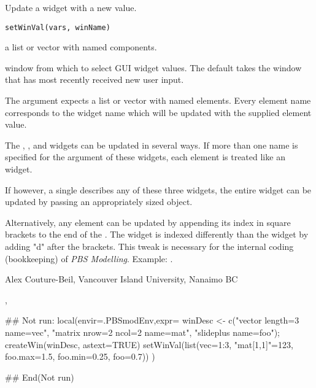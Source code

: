 \documentclass[letterpaper]{book}
\begin{document}
%
\begin{Description}\relax
Update a widget with a new value.
\end{Description}
%
\begin{Usage}
\begin{verbatim}
setWinVal(vars, winName)
\end{verbatim}
\end{Usage}
%
\begin{Arguments}
\begin{ldescription}
\item[\code{vars}] a list or vector with named components.
\item[\code{winName}] window from which to select GUI widget values. The default 
takes the window that has most recently received new user input.
\end{ldescription}
\end{Arguments}
%
\begin{Details}\relax
The  argument expects a list or vector with named elements. 
Every element name corresponds to the widget name which will be updated 
with the supplied element value.

The , , and  widgets can be updated in 
several ways. If more than one name is specified for the  argument 
of these widgets, each element is treated like an  widget. 

If however, a single  describes any of these three widgets, the entire 
widget can be updated by passing an appropriately sized object.

Alternatively, any element can be updated by appending its index in square brackets 
to the end of the . The  widget is indexed differently 
than the  widget by adding "d" after the brackets. This tweak is necessary 
for the internal coding (bookkeeping) of \emph{PBS Modelling}. Example: .
\end{Details}
%
\begin{Author}\relax
Alex Couture-Beil, Vancouver Island University, Nanaimo BC
\end{Author}
%
\begin{SeeAlso}\relax
{}, 
\end{SeeAlso}
%
\begin{Examples}
\begin{ExampleCode}
## Not run: 
local(envir=.PBSmodEnv,expr={
  winDesc <- c("vector length=3 name=vec",
    "matrix nrow=2 ncol=2 name=mat", "slideplus name=foo");
  createWin(winDesc, astext=TRUE)
  setWinVal(list(vec=1:3, "mat[1,1]"=123, foo.max=1.5, foo.min=0.25, foo=0.7))
})

## End(Not run)
\end{ExampleCode}
\end{Examples}
\end{document}
